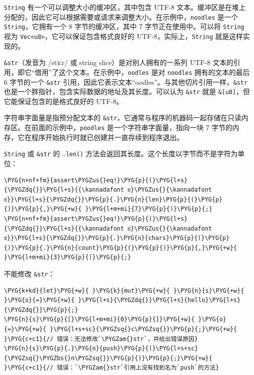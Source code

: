 
\texttt{String} 有一个可以调整大小的缓冲区，其中包含 UTF-8 文本。缓冲区是在堆上分配的，因此它可以根据需要或请求来调整大小。在示例中，\texttt{noodles} 是一个 \texttt{String}，它拥有一个 8 字节的缓冲区，其中 7 字节正在使用中。可以将 \texttt{String} 视为 \texttt{Vec<u8>}，它可以保证包含格式良好的 UTF-8，实际上，\texttt{String} 就是这样实现的。

\texttt{\&str}（发音为 /stɜːr/ 或 string slice）是对别人拥有的一系列 UTF-8 文本的引用，即它“借用”了这个文本。在示例中，\texttt{oodles} 是对 \texttt{noodles} 拥有的文本的最后 6 字节的一个 \texttt{\&str} 引用，因此它表示文本“oodles”。与其他切片引用一样，\texttt{\&str} 也是一个胖指针，包含实际数据的地址及其长度。可以认为 \texttt{\&str} 就是 \texttt{\&[u8]}，但它能保证包含的是格式良好的 UTF-8。

字符串字面量是指预分配文本的 \texttt{\&str}，它通常与程序的机器码一起存储在只读内存区。在前面的示例中，\texttt{poodles} 是一个字符串字面量，指向一块 7 字节的内存，它在程序开始执行时就已创建并一直存续到程序退出。

\texttt{String} 或 \texttt{\&str} 的 \texttt{.len()} 方法会返回其长度。这个长度以字节而不是字符为单位：

\begin{Verbatim}[commandchars=\\\{\},breaklines=true,breakanywhere=true,fontsize=\codefont,xleftmargin=17bp]
\PYG{n+nf+fm}{assert\PYGZus{}eq!}\PYG{p}{(}\PYG{l+s}{\PYGZdq{}}\PYG{l+s}{{\kannadafont ಠ}\PYGZus{}{\kannadafont ಠ}}\PYG{l+s}{\PYGZdq{}}\PYG{p}{.}\PYG{n}{len}\PYG{p}{(}\PYG{p}{)}\PYG{p}{,}\PYG{+w}{ }\PYG{l+m+mi}{7}\PYG{p}{)}\PYG{p}{;}
\PYG{n+nf+fm}{assert\PYGZus{}eq!}\PYG{p}{(}\PYG{l+s}{\PYGZdq{}}\PYG{l+s}{{\kannadafont ಠ}\PYGZus{}{\kannadafont ಠ}}\PYG{l+s}{\PYGZdq{}}\PYG{p}{.}\PYG{n}{chars}\PYG{p}{(}\PYG{p}{)}\PYG{p}{.}\PYG{n}{count}\PYG{p}{(}\PYG{p}{)}\PYG{p}{,}\PYG{+w}{ }\PYG{l+m+mi}{3}\PYG{p}{)}\PYG{p}{;}
\end{Verbatim}

不能修改 \texttt{\&str}：

\begin{Verbatim}[commandchars=\\\{\},breaklines=true,breakanywhere=true,fontsize=\codefont,xleftmargin=17bp]
\PYG{k+kd}{let}\PYG{+w}{ }\PYG{k}{mut}\PYG{+w}{ }\PYG{n}{s}\PYG{+w}{ }\PYG{o}{=}\PYG{+w}{ }\PYG{l+s}{\PYGZdq{}}\PYG{l+s}{hello}\PYG{l+s}{\PYGZdq{}}\PYG{p}{;}
\PYG{n}{s}\PYG{p}{[}\PYG{l+m+mi}{0}\PYG{p}{]}\PYG{+w}{ }\PYG{o}{=}\PYG{+w}{ }\PYG{l+s+sc}{\PYGZsq{}c\PYGZsq{}}\PYG{p}{;}\PYG{+w}{    }\PYG{c+c1}{// 错误：无法修改`\PYGZam{}str`，并给出错误原因}
\PYG{n}{s}\PYG{p}{.}\PYG{n}{push}\PYG{p}{(}\PYG{l+s+sc}{\PYGZsq{}\PYGZbs{}n\PYGZsq{}}\PYG{p}{)}\PYG{p}{;}\PYG{+w}{  }\PYG{c+c1}{// 错误：`\PYGZam{}str`引用上没有找到名为`push`的方法}
\end{Verbatim}


